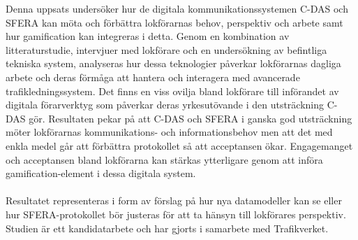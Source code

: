 \documentclass[swedish]{maucsthesis}
\begin{document}

\author{Anthon Haväng}

\subject{Datavetenskap}


\maketitle %

\begin{sammanfattning}
    Denna uppsats undersöker hur de digitala kommunikationssystemen C-DAS och SFERA kan möta och förbättra lokförarnas behov, perspektiv och arbete samt hur gamification kan integreras i detta.
    Genom en kombination av litteraturstudie, intervjuer med lokförare och en undersökning av befintliga tekniska system, analyseras hur dessa teknologier påverkar lokförarnas dagliga arbete och deras förmåga att hantera och interagera med avancerade trafikledningssystem.
    Det finns en viss ovilja bland lokförare till införandet av digitala förarverktyg som påverkar deras yrkesutövande i den utsträckning C-DAS gör.
    Resultaten pekar på att C-DAS och SFERA i ganska god utsträckning möter lokförarnas kommunikations- och informationsbehov men att det med enkla medel går att förbättra protokollet så att acceptansen ökar.
    Engagemanget och acceptansen bland lokförarna kan stärkas ytterligare genom att införa gamification-element i dessa digitala system.
    \paragraph{}
    \hspace{-14pt}
    Resultatet representeras i form av förslag på hur nya datamodeller kan se eller hur SFERA-protokollet bör justeras för att ta hänsyn till lokförares perspektiv.
    Studien är ett kandidatarbete och har gjorts i samarbete med Trafikverket.
\end{sammanfattning}
\end{document}
